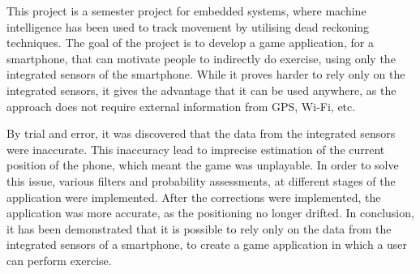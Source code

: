 This project is a semester project for embedded systems, where machine intelligence has been used to track movement by utilising dead reckoning techniques. 
The goal of the project is to develop a game application, for a smartphone, that can motivate people to indirectly do exercise, using only the integrated sensors of the smartphone.
While it proves harder to rely only on the integrated sensors, it gives the advantage that it can be used anywhere, as the approach does not require external information from GPS, Wi-Fi, etc. 

By trial and error, it was discovered that the data from the integrated sensors were inaccurate. 
This inaccuracy lead to imprecise estimation of the current position of the phone, which meant the game was unplayable. 
In order to solve this issue, various filters and probability assessments, at different stages of the application were implemented.
After the corrections were implemented, the application was more accurate, as the positioning no longer drifted. 
In conclusion, it has been demonstrated that it is possible to rely only on the data from the integrated sensors of a smartphone, to create a game application in which a user can perform exercise.